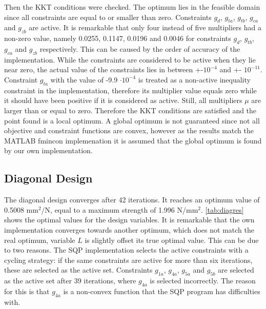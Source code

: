 Then the KKT conditions were checked. The optimum lies in the feasible domain since all constraints are equal to or smaller than zero. Constraints $g_d$, $g_{ta}$, $g_{tb}$, $g_{ca}$ and $g_{zb}$ are active. It is remarkable that only four instead of five multipliers had a non-zero value, namely 0.0255, 0.1147, 0.0196 and 0.0046 for constraints $g_d$, $g_{tb}$, $g_{ca}$ and $g_{zb}$ respectively. This can be caused by the order of accuracy of the implementation. While the constraints are considered to be active when they lie near zero, the actual value of the constraints lies in between +-$10^{-4}$ and +- $10^{-11}$. Constraint $g_{ta}$ with the value of -9.9 $\cdot 10^{-4}$ is treated as a non-active inequality constraint in the implementation, therefore its multiplier value equals zero while it should have been positive if it is considered as active. Still, all multipliers $\mu$ are larger than or equal to zero. Therefore the KKT conditions are satisfied and the point found is a local optimum. A global optimum is not guaranteed since not all objective and constraint functions are convex, however as the results match the MATLAB fmincon implemenation it is assumed that the global optimum is found by our own implementation.


\subsection{Diagonal Design}
The diagonal design converges after 42 iterations. It reaches an optimum value of 0.5008 mm$^2$/N, equal to a maximum strength of 1.996 N/mm$^2$. \autoref{tab:diagres} shows the optimal values for the design variables. It is remarkable that the own implementation converges towards another optimum, which does not match the real optimum, variable $L$ is slightly offset its true optimal value. This can be due to two reasons. The SQP implementation selects the active constraints with a cycling strategy: if the same constraints are active for more than six iterations, these are selected as the active set. Constraints $g_{1a}$, $g_{4a}$, $g_{5a}$ and $g_{5b}$ are selected as the active set after 39 iterations, where $g_{4a}$ is selected incorrectly. The reason for this is that $g_{4a}$ is a non-convex function that the SQP program has difficulties with. \\


